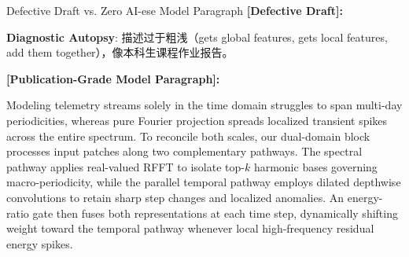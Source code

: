 \begin{ExampleBox}{Defective Draft vs. Zero AI-ese Model Paragraph}
\textbf{\color{TargetHighlight}[Defective Draft]:}\par
{}\par\vspace{4pt}
\textbf{Diagnostic Autopsy}: 描述过于粗浅（gets global features, gets local features, add them together），像本科生课程作业报告。\par\vspace{6pt}
\textbf{\color{AcadNavy}[Publication-Grade Model Paragraph]:}\par
Modeling telemetry streams solely in the time domain struggles to span multi-day periodicities, whereas pure Fourier projection spreads localized transient spikes across the entire spectrum. To reconcile both scales, our dual-domain block processes input patches along two complementary pathways. The spectral pathway applies real-valued RFFT to isolate top-$k$ harmonic bases governing macro-periodicity, while the parallel temporal pathway employs dilated depthwise convolutions to retain sharp step changes and localized anomalies. An energy-ratio gate then fuses both representations at each time step, dynamically shifting weight toward the temporal pathway whenever local high-frequency residual energy spikes.
\end{ExampleBox}
